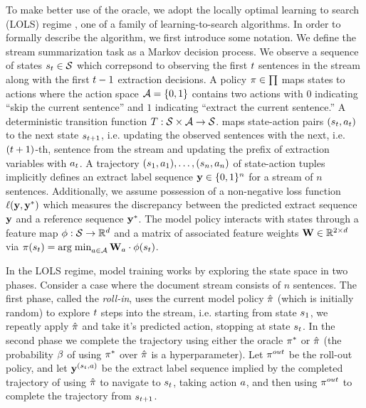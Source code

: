 To make better use of the oracle, we adopt the locally optimal learning to
search (LOLS) regime \citep{chang2015learning}, one of a family of 
learning-to-search algorithms. In order to formally describe the algorithm, we
first introduce some notation. We define the stream summarization task as a 
Markov decision process. We observe a sequence of states $s_t \in 
\mathcal{S}$ which correpsond to observing the first $t$ sentences in 
the stream along with the first $t-1$ extraction decisions. A policy 
$\pi \in \prod$ maps states to
actions where the action space $\mathcal{A} = \{0, 1\}$ contains two 
actions with $0$ indicating ``skip the current sentence'' and $1$ 
indicating ``extract the current sentence.'' A deterministic transition
function $T : \mathcal{S} \times \mathcal{A} \rightarrow \mathcal{S}$.
maps state-action pairs $(s_t, a_t)$ to the next 
state $s_{t + 1}$, i.e. updating the observed
sentences with the next, i.e. $(t + 1)$-th, sentence from the stream 
and 
updating the prefix of extraction variables with $a_t$.
A trajectory $(s_1, a_1), \ldots, (s_n, a_n)$
of state-action tuples
implicitly defines an extract label sequence $\mathbf{y} \in \{0, 1\}^n$
for a stream of $n$ sentences.
Additionally, we assume possession of a non-negative loss function 
$\ell(\mathbf{y}, \mathbf{y}^*)$
which measures the discrepancy between the predicted extract sequence 
$\mathbf{y}$ and a reference sequence $\mathbf{y}^*$.
The model policy interacts with states through a feature
map $\phi : \mathcal{S} \rightarrow \mathbb{R}^{d}$ and a matrix 
of associated feature
weights $\mathbf{W}\in \mathbb{R}^{2 \times d}$ via $\pi(s_t)
= \operatorname{arg\; min}_{a \in \mathcal{A}} 
    \mathbf{W}_a \cdot \phi(s_t)$.


In the LOLS regime, model training works by exploring the state space in 
two phases. Consider a case where the document stream consists of $n$ 
sentences. The first phase, called 
the \textit{roll-in}, uses the current model policy $\hat{\pi}$ (which
is initially random) to explore $t$ steps into the stream, i.e. starting
from state $s_1$, we repeatly apply $\hat{\pi}$ and take it's 
predicted action, stopping at state $s_t$. 
In the second phase we complete the trajectory using either the oracle 
$\pi^{*}$ or $\hat{\pi}$ (the probability $\beta$ of using 
$\pi^{*}$ over $\hat{\pi}$ is a hyperparameter). Let 
$\pi^{out}$ be the roll-out policy, and let 
$\mathbf{y}^{(s_t, a)}$ be the extract label
sequence implied by the completed trajectory of using $\hat{\pi}$
to navigate to $s_t$, taking action $a$, 
and then using $\pi^{out}$ to complete the trajectory from 
$s_{t + 1}$.

